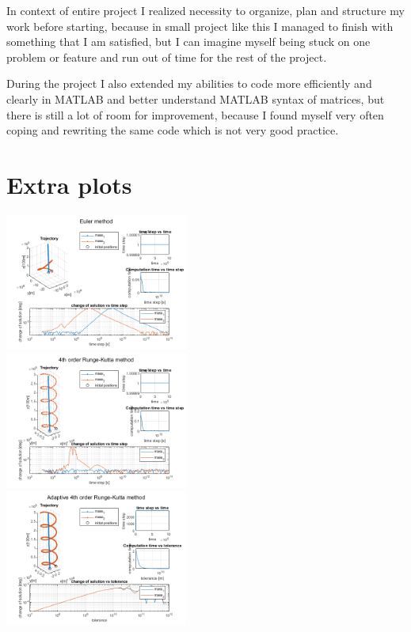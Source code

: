 \documentclass[english,12pt,a4paper, notitlepage]{report}
\begin{document}
	In context of entire project I realized necessity to organize, plan and structure my work before starting, because in small project like this I managed to finish with something that I am satisfied, but I can imagine myself being stuck on one problem or feature and run out of time for the rest of the project.
	
	During the project I also extended my abilities to code more efficiently and clearly in MATLAB and better understand MATLAB syntax of matrices, but there is still a lot of room for improvement, because I found myself very often coping and rewriting the same code which is not very good practice.
	
	
	
	\appendix
	\chapter{Extra plots}\label{ap:plots}
	\begin{center}
		\includegraphics[width=0.45\textwidth]{coolplot1.png} \\
		\includegraphics[width=0.45\textwidth]{coolplot2.png} \\
		\includegraphics[width=0.45\textwidth]{coolplot3.png}
	\end{center}
	
\end{document}

